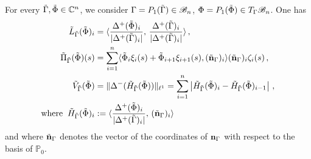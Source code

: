 \begin{prop}\label{constraints-discrete} For every $\tilde{\Gamma}, \tilde{\Phi}\in\mathbb{C}^n$, we consider $\Gamma=P_1(\tilde{\Gamma})\in\mathcal{B}_n$, $\Phi=P_1(\tilde{\Phi})\in T_\Gamma \mathcal{B}_n$. One has 
\begin{align}\label{eq-expression-tL}
	\tilde{L}_{\tilde{\Gamma}}(\tilde{\Phi})_i &= \langle \frac{\Delta^+(\tilde{\Phi})_i}{|\Delta^+(\tilde{\Gamma})_i|} ,\, \frac{\Delta^+ (\tilde{\Gamma})_i}{|\Delta^+ (\tilde{\Gamma})_i|} \rangle\, , \\
	\label{eq-expression-tPi}
	\tilde{\Pi}_{\tilde{\Gamma}}(\tilde{\Phi})(s) &= \sum_{i=1}^n \langle \tilde{\Phi}_i\xi_i(s) + \tilde{\Phi}_{i+1} \xi_{i
+1}(s),  (\tilde{\bf n}_\Gamma)_i \rangle(\tilde{\bf n}_\Gamma)_i \zeta_i(s) \, ,
	  \\
	\label{eq-expression-tV}
		\tilde{V}_{\tilde{\Gamma}}(\tilde{\Phi}) & 
		= \| \Delta^- ( \tilde H_{\tilde{\Gamma}}(\tilde{\Phi}) )  \|_{\ell^1} 
		= 
		\sum_{i=1}^n
		\left| 
			\tilde H_{\tilde{\Gamma}}(\tilde{\Phi})_i
			-
			\tilde H_{\tilde{\Gamma}}(\tilde{\Phi})_{i-1}
		\right|\, , \\
	\mbox{where}\;\;\tilde H_{\tilde{\Gamma}}(\tilde{\Phi})_i & := \langle  \frac{\Delta^+(\tilde{\Phi})_i}{|\Delta^+(\tilde{\Gamma})_i|} ,\, (\tilde{\bf n}_\Gamma)_i \rangle
\end{align}
and where $\tilde{\bf n}_\Gamma$ denotes the vector of the coordinates of ${\bf n}_\Gamma$ with respect to the basis of $\mathbb{P}_0$.
\end{prop}


